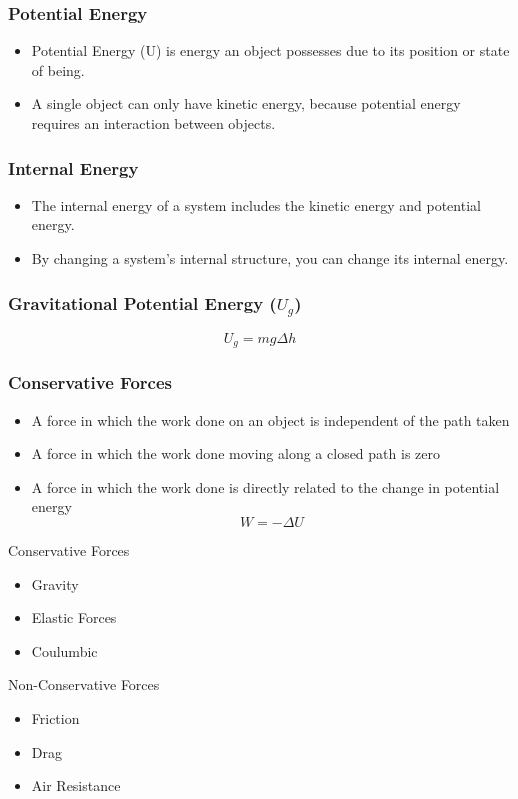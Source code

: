 \documentclass[12pt]{article}
\theoremstyle{break}
\numberwithin{theorem}{subsection}
\numberwithin{lemma}{subsection}
\numberwithin{corollary}{subsection}
\numberwithin{equation}{subsection}
\begin{document}
\subsubsection{Potential Energy}
\begin{itemize}
	\item Potential Energy (U) is energy an object possesses due to its position or state of being.
	\item A single object can only have kinetic energy, because potential energy requires an 
		interaction between objects.
\end{itemize}

\subsubsection{Internal Energy}
\begin{itemize}
	\item The internal energy of a system includes the kinetic energy and potential energy.
	\item By changing a system's internal structure, you can change its internal energy.
\end{itemize}

\subsubsection{Gravitational Potential Energy ($U_g$)}
\begin{equation*}
	U_g = mg \Delta h
\end{equation*}

\subsubsection{Conservative Forces}
\begin{itemize}
	\item A force in which the work done on an object is independent of the path taken
	\item A force in which the work done moving along a closed path is zero
	\item A force in which the work done is directly related to the change in potential energy
	\begin{equation*}
		W = - \Delta U
	\end{equation*}
\end{itemize}
Conservative Forces
\begin{itemize}
	\item Gravity
	\item Elastic Forces
	\item Coulumbic
\end{itemize}
Non-Conservative Forces
\begin{itemize}
	\item Friction
	\item Drag
	\item Air Resistance
\end{itemize}
\end{document}
